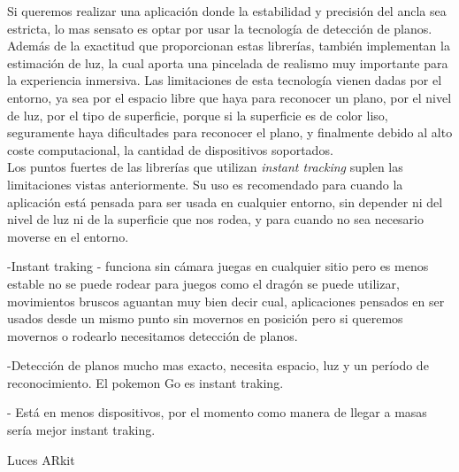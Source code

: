 Si queremos realizar una aplicación donde la estabilidad y precisión del ancla sea estricta, lo mas sensato es optar por usar la tecnología de detección de planos. Además de la exactitud que proporcionan estas librerías, también implementan la estimación de luz, la cual aporta una pincelada de realismo muy importante para la experiencia inmersiva. Las limitaciones de esta tecnología vienen dadas por el entorno, ya sea por el espacio libre que haya para reconocer un plano, por el nivel de luz, por el tipo de superficie, porque si la superficie es de color liso, seguramente haya dificultades para reconocer el plano, y finalmente debido al alto coste computacional, la cantidad de dispositivos soportados.\\

Los puntos fuertes de las librerías que utilizan \textit{instant tracking} suplen las limitaciones vistas anteriormente. Su uso es recomendado para cuando la aplicación está pensada para ser usada en cualquier entorno, sin depender ni del nivel de luz ni de la superficie que nos rodea, y para cuando no sea necesario moverse en el entorno. 


-Instant traking - funciona sin cámara juegas en cualquier sitio pero es menos estable
	no se puede rodear para juegos como el dragón se puede utilizar, movimientos bruscos aguantan muy bien decir cual, aplicaciones pensados en ser usados desde un mismo punto sin movernos en posición pero si queremos movernos o rodearlo necesitamos detección de planos.
    
-Detección de planos mucho mas exacto, necesita espacio, luz y un período de reconocimiento. El pokemon Go es instant traking.

- Está en menos dispositivos, por el momento como manera de llegar a masas sería mejor instant traking.

Luces ARkit




















\noindent